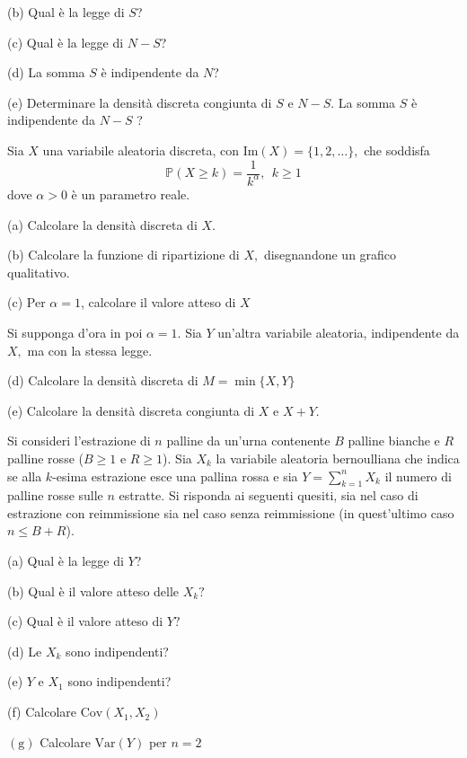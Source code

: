 (b) Qual è la legge di $S$?

(c) Qual è la legge di $N-S$?

(d) La somma $S$ è indipendente da $N$?

(e) Determinare la densità discreta congiunta di $S$ e $N-S$. La somma $S$ è indipendente da $N-S$ ?
\Esercizio{}

Sia $X$ una variabile aleatoria discreta, con $\mathrm{Im} (X)=\{1,2,\dotsc \},$ che soddisfa
\begin{equation*}
\mathbb{P} (X\geq k)=\frac{1}{k^{\alpha }} ,\ \ k\geq 1
\end{equation*}
dove $\alpha  >0$ è un parametro reale.

(a) Calcolare la densità discreta di $X$.

(b) Calcolare la funzione di ripartizione di $X,$ disegnandone un grafico qualitativo.

(c) Per $\alpha =1$, calcolare il valore atteso di $X$

Si supponga d'ora in poi $\alpha =1.$ Sia $Y$ un'altra variabile aleatoria, indipendente da $X,$ ma con la stessa legge.

(d) Calcolare la densità discreta di $M=\min \{X,Y\}$

(e) Calcolare la densità discreta congiunta di $X$ e $X+Y$.
\Esercizio{}

Si consideri l'estrazione di $n$ palline da un'urna contenente $B$ palline bianche e $R$ palline rosse ($B\geq 1$ e $R\geq 1$). Sia $X_{k}$ la variabile aleatoria bernoulliana che indica se alla $k$-esima estrazione esce una pallina rossa e sia $Y=\sum _{k=1}^{n} X_{k}$ il numero di palline rosse sulle $n$ estratte. Si risponda ai seguenti quesiti, sia nel caso di estrazione con reimmissione sia nel caso senza reimmissione (in quest'ultimo caso $n\leq B+R$).

(a) Qual è la legge di $Y$?

(b) Qual è il valore atteso delle $X_{k} ?$

(c) Qual è il valore atteso di $Y?$

(d) Le $X_{k}$ sono indipendenti?

(e) $Y$ e $X_{1}$ sono indipendenti?

(f) Calcolare $\mathrm{Cov}( X_{1} ,X_{2})$

$(\mathrm{g} )$ Calcolare $\mathrm{Var} (Y)$ per $n=2$
\Esercizio{}

